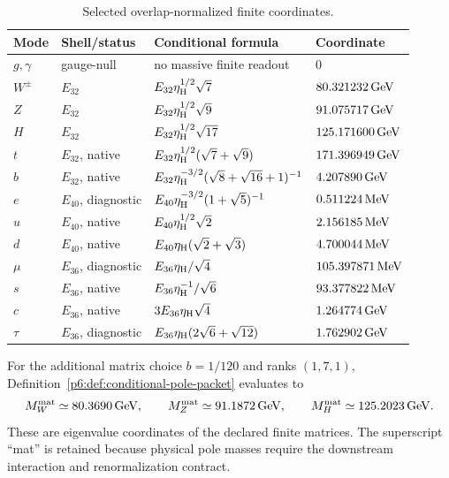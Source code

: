 \documentclass[11pt,a4paper]{article}
\newcommand{\etaH}{\eta_{\rm H}}
\begin{document}
\begin{table}[H]
\centering
\caption{Selected overlap-normalized finite coordinates.}
\label{p6:tab:selected-finite-coordinates}
\scriptsize
{}
\renewcommand{\arraystretch}{1.12}
\setlength{\tabcolsep}{3pt}
\begin{tabularx}{\textwidth}{@{}L{0.08\textwidth}L{0.22\textwidth}
L{0.42\textwidth}R{0.20\textwidth}@{}}
\toprule
Mode & Shell/status & Conditional formula & Coordinate \\
\midrule
\(g,\gamma\)& gauge-null & no massive finite readout & \(0\)\\
\(W^\pm\)& \(E_{32}\) &
\(E_{32}\etaH^{1/2}\sqrt7\)&\(80.321232\,{\rm GeV}\)\\
\(Z\)& \(E_{32}\) &
\(E_{32}\etaH^{1/2}\sqrt9\)&\(91.075717\,{\rm GeV}\)\\
\(H\)& \(E_{32}\) &
\(E_{32}\etaH^{1/2}\sqrt{17}\)&\(125.171600\,{\rm GeV}\)\\
\(t\)& \(E_{32}\), native &
\(E_{32}\etaH^{1/2}(\sqrt7+\sqrt9)\)&\(171.396949\,{\rm GeV}\)\\
\(b\)& \(E_{32}\), native &
\(E_{32}\etaH^{-3/2}(\sqrt8+\sqrt{16}+1)^{-1}\)&
\(4.207890\,{\rm GeV}\)\\
\(e\)& \(E_{40}\), diagnostic &
\(E_{40}\etaH^{-3/2}(1+\sqrt5)^{-1}\)&\(0.511224\,{\rm MeV}\)\\
\(u\)& \(E_{40}\), native &
\(E_{40}\etaH^{1/2}\sqrt2\)&\(2.156185\,{\rm MeV}\)\\
\(d\)& \(E_{40}\), native &
\(E_{40}\etaH(\sqrt2+\sqrt3)\)&\(4.700044\,{\rm MeV}\)\\
\(\mu\)& \(E_{36}\), diagnostic &
\(E_{36}\etaH/\sqrt4\)&\(105.397871\,{\rm MeV}\)\\
\(s\)& \(E_{36}\), native &
\(E_{36}\etaH^{-1}/\sqrt6\)&\(93.377822\,{\rm MeV}\)\\
\(c\)& \(E_{36}\), native &
\(3E_{36}\etaH\sqrt4\)&\(1.264774\,{\rm GeV}\)\\
\(\tau\)& \(E_{36}\), diagnostic &
\(E_{36}\etaH(2\sqrt6+\sqrt{12})\)&\(1.762902\,{\rm GeV}\)\\
\bottomrule
\end{tabularx}
\end{table}

\begin{corollary}
\label{p6:cor:selected-pole-coordinates}
For the additional matrix choice
\(
b=1/120
\)
and ranks \((1,7,1)\),
Definition~\ref{p6:def:conditional-pole-packet} evaluates to
\[
M_W^{\rm mat}\simeq80.3690\,{\rm GeV},
\qquad
M_Z^{\rm mat}\simeq91.1872\,{\rm GeV},
\qquad
M_H^{\rm mat}\simeq125.2023\,{\rm GeV}.
\]
These are eigenvalue coordinates of the declared finite matrices.  The
superscript ``mat'' is retained because physical pole masses require the
downstream interaction and renormalization contract.
\end{corollary}
\end{document}
